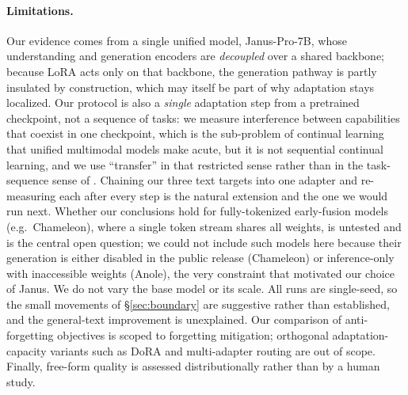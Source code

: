 \documentclass{article}
\begin{document}
\paragraph{Limitations.}
Our evidence comes from a single unified model, Janus-Pro-7B, whose
understanding and generation encoders are \emph{decoupled} over a shared
backbone; because LoRA acts only on that backbone, the generation pathway is
partly insulated by construction, which may itself be part of why adaptation
stays localized. Our protocol is also a \emph{single} adaptation step from a
pretrained checkpoint, not a sequence of tasks: we measure interference between
capabilities that coexist in one checkpoint, which is the sub-problem of
continual learning that unified multimodal models make acute, but it is not
sequential continual learning, and we use ``transfer'' in that restricted sense
rather than in the task-sequence sense of \citet{lopezpaz2017gem}. Chaining our
three text targets into one adapter and re-measuring each after every step is the
natural extension and the one we would run next. Whether our conclusions hold for
fully-tokenized early-fusion models (e.g.\ Chameleon), where a single token
stream shares all weights, is untested and is the central open question; we could
not include such models here because their generation is either disabled in the
public release (Chameleon) or inference-only with inaccessible weights (Anole),
the very constraint that motivated our choice of Janus. We do not vary the base
model or its scale. All runs are single-seed, so the small movements of
\S\ref{sec:boundary} are suggestive rather than established, and the general-text
improvement is unexplained. Our comparison of anti-forgetting objectives is
scoped to forgetting mitigation; orthogonal adaptation-capacity variants such as
DoRA \citep{liu2024dora} and multi-adapter routing are out of scope. Finally,
free-form quality is assessed distributionally rather than by a human study.
\end{document}
